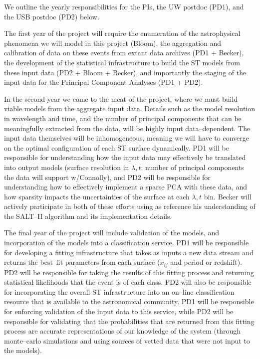 We outline the yearly responsibilities for the PIs, the UW postdoc (PD1), and
the USB postdoc (PD2) below.

 \smallskip

The first year of the project will require the enumeration of the astrophysical
phenomena we will model in this project (Bloom), the aggregation and calibration
of data on these events from extant data archives (PD1 + Becker), the
development of the statistical infrastructure to build the ST models from these
input data (PD2 + Bloom + Becker), and importantly the staging of the input data
for the Principal Component Analyses (PD1 + PD2).

 \smallskip

In the second year we come to the meat of the project, where we must build
viable models from the aggregate input data.  Details such as the model
resolution in wavelength and time, and the number of principal components that
can be meaningfully extracted from the data, will be highly input
data--dependent.  The input data themselves will be inhomogeneous, meaning we
will have to converge on the optimal configuration of each ST surface
dynamically. PD1 will be responsible for understanding how the input data may
effectively be translated into output models (surface resolution in $\lambda,
t$; number of principal components the data will support w/Connolly), and PD2
will be responsible for understanding how to effectively implement a sparse PCA
with these data, and how sparsity impacts the uncertainties of the surface at
each $\lambda, t$ bin. Becker will actively participate in both of these efforts
using as reference his understanding of the SALT--II algorithm and its
implementation details.


 \smallskip

The final year of the project will include validation of the models, and
incorporation of the models into a classification service.  PD1 will be
responsible for developing a fitting infrastructure that takes as inputs a new
data stream and returns the best--fit parameters from each surface ($x_{ij}$ and
period or redshift).  PD2 will be responsible for taking the results of this
fitting process and returning statistical likelihoods that the event is of each
class.  PD2 will also be responsible for incorporating the overall ST
infrastructure into an on--line classification resource that is available to the
astronomical community. PD1 will be responsible for enforcing validation of the
input data to this service, while PD2 will be responsible for validating that
the probabilities that are returned from this fitting process are accurate
representations of our knowledge of the system (through monte--carlo simulations
and using sources of vetted data that were not input to the models).
